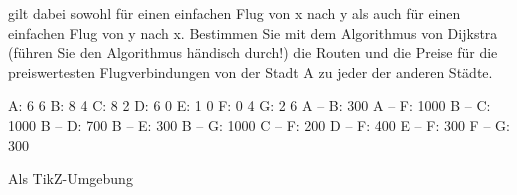 \documentclass{bschlangaul-aufgabe}
\begin{document}
\noindent
gilt dabei sowohl für einen einfachen Flug von x nach y als auch für
einen einfachen Flug von y nach x. Bestimmen Sie mit dem Algorithmus von
Dijkstra (führen Sie den Algorithmus händisch durch!) die Routen und die
Preise für die preiswertesten Flugverbindungen von der Stadt A zu jeder
der anderen Städte.

\begin{bGraphenFormat}
A: 6 6
B: 8 4
C: 8 2
D: 6 0
E: 1 0
F: 0 4
G: 2 6
A -- B: 300
A -- F: 1000
B -- C: 1000
B -- D: 700
B -- E: 300
B -- G: 1000
C -- F: 200
D -- F: 400
E -- F: 300
F -- G: 300
\end{bGraphenFormat}

Als TikZ-Umgebung

\end{document}
